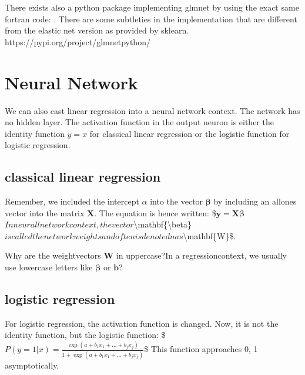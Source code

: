 \documentclass[letterpaper,10pt,english]{jupyterBook}
\begin{document}
\sphinxAtStartPar
There exists also a python package implementing glmnet by using the exact same fortran code: .
There are some subtleties in the implementation that are different from the elastic net version as provided by sklearn.
https://pypi.org/project/glmnet\sphinxhyphen{}python/


\chapter{Neural Network}
\label{\detokenize{Regression_Techniques:neural-network}}
\sphinxAtStartPar
We can also cast linear regression into a neural network context. The network has no hidden layer. The activation function in the output neuron is either the identity function \(y=x\) for classical linear regression or the logistic function for logistic regression.

\noindent{}


\section{classical linear regression}
\label{\detokenize{Regression_Techniques:classical-linear-regression}}


\sphinxAtStartPar
Remember, we included the intercept \(\alpha\) into the vector \(\mathbf{\beta}\) by including an all\sphinxhyphen{}ones vector into the matrix \(\mathbf{X}\). The equation is hence written:
\$\(\mathbf{y} = \mathbf{X} \mathbf{\beta}\)\(
In neurall network context, the vector \)\textbackslash{}mathbf\{\textbackslash{}beta\}\( is called the network weights and often is denotedn as \)\textbackslash{}mathbf\{W\}\$.

\sphinxAtStartPar
Why are the weight\sphinxhyphen{}vectors \(\mathbf{W}\) in upper\sphinxhyphen{}case?In a regression\sphinxhyphen{}context, we usually use lower\sphinxhyphen{}case letters like \(\mathbf{\beta}\) or \(\mathbf{b}\)?

\noindent{}


\section{logistic regression}
\label{\detokenize{Regression_Techniques:logistic-regression}}


\sphinxAtStartPar
For logistic regression, the activation function is changed. Now, it is not the identity function, but the logistic function:
\$\(P(y=1 |x) = \frac{\exp(a + b_{1}x_1 + \ldots + b_jx_j)}{1 + \exp(a + b_{1}x_1 + \ldots + b_jx_j)}\)\$
This function approaches 0, 1 asymptotically.
\end{document}
